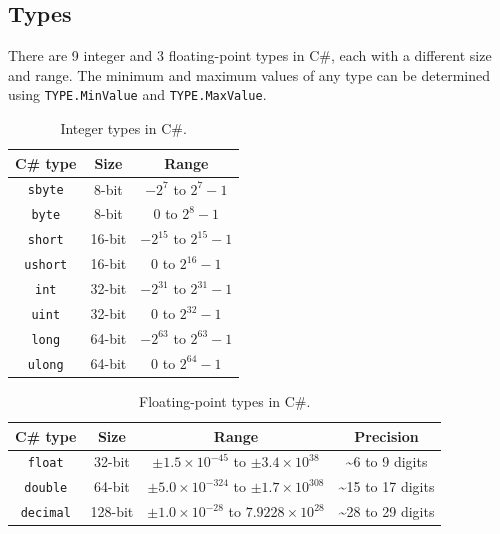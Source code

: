\documentclass{article}
\begin{document}
\subsection{Types}
There are 9 integer and 3 floating-point types in C\#, each with a different size and range. The minimum and maximum
values of any type can be determined using \lstinline{TYPE.MinValue} and \linebreak \lstinline{TYPE.MaxValue}.
\begin{table}[H]
    \centering
    \begin{tabular}{c c c}
        \toprule
        \textbf{C\# type}  & \textbf{Size} & \textbf{Range}                \\
        \midrule
        \lstinline!sbyte!  & 8-bit         & \(-2^7\) to \(2^7 - 1\)       \\
        \lstinline!byte!   & 8-bit         & \(0\) to \(2^8 - 1\)          \\
        \lstinline!short!  & 16-bit        & \(-2^{15}\) to \(2^{15} - 1\) \\
        \lstinline!ushort! & 16-bit        & \(0\) to \(2^{16} - 1\)       \\
        \lstinline!int!    & 32-bit        & \(-2^{31}\) to \(2^{31} - 1\) \\
        \lstinline!uint!   & 32-bit        & \(0\) to \(2^{32} - 1\)       \\
        \lstinline!long!   & 64-bit        & \(-2^{63}\) to \(2^{63} - 1\) \\
        \lstinline!ulong!  & 64-bit        & \(0\) to \(2^{64} - 1\)       \\
        \bottomrule
    \end{tabular}
    \caption{Integer types in C\#.}
\end{table}
\begin{table}[H]
    \centering
    \begin{tabular}{c c c c}
        \toprule
        \textbf{C\# type}   & \textbf{Size} & \textbf{Range}                                              & \textbf{Precision}   \\
        \midrule
        \lstinline!float!   & 32-bit        & \(\pm 1.5 \times 10^{-45}\) to \(\pm 3.4 \times 10^{38}\)   & \sim 6 to 9 digits   \\
        \lstinline!double!  & 64-bit        & \(\pm 5.0 \times 10^{-324}\) to \(\pm 1.7 \times 10^{308}\) & \sim 15 to 17 digits \\
        \lstinline!decimal! & 128-bit       & \(\pm 1.0 \times 10^{-28}\) to \(7.9228 \times 10^{28}\)    & \sim 28 to 29 digits \\
        \bottomrule
    \end{tabular}
    \caption{Floating-point types in C\#.}
\end{table}
\end{document}
